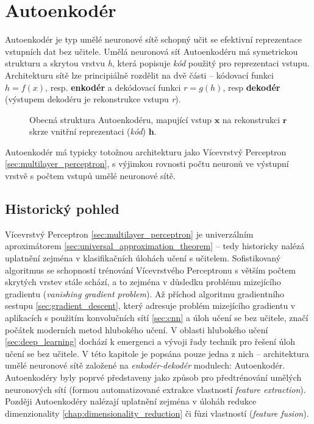 \section{Autoenkodér}
Autoenkodér je typ umělé neuronové sítě schopný učit se efektivní reprezentace vstupních dat bez učitele. Umělá neuronová síť Autoenkodéru má symetrickou strukturu a skrytou vrstvu \emph{h}, která popisuje \emph{kód} použitý pro reprezentaci vstupu.
Architekturu sítě lze principiálně rozdělit na dvě části – kódovací funkci $h = f(x)$, resp. \textbf{enkodér}
a dekódovací funkci $r = g(h)$, resp \textbf{dekodér} (výstupem dekodéru je rekonstrukce vstupu \emph{r}).

\begin{figure}[h]
    \centering
    \caption{Obecná struktura Autoenkodéru, mapující vstup $\mathbf{x}$ na rekonstrukci $\mathbf{r}$ skrze vnitřní reprezentaci (\emph{kód}) $\mathbf{h}$.}
\end{figure}


Autoenkodér má typicky totožnou architekturu jako Vícevrstvý Perceptron \autoref{sec:multilayer_perceptron}, s výjimkou rovnosti počtu neuronů ve výstupní vrstvě s počtem vstupů umělé neuronové sítě.
\subsection{Historický pohled}
Vícevrstvý Perceptron \autoref{sec:multilayer_perceptron} je univerzálním aproximátorem \autoref{sec:universal_approximation_theorem} – tedy historicky nalézá uplatnění zejména v klasifikačních úlohách učení s učitelem.
Sofistikovaný algoritmus se schopností trénování Vícevrstvého Perceptronu s větším počtem skrytých vrstev stále schází, a to zejména v důsledku problému mizejícího gradientu (\emph{vanishing gradient problem}).
Až příchod algoritmu gradientního sestupu \autoref{sec:gradient_descent}, který adresuje problém mizejícího gradientu v aplikacích s použitím konvolučních sítí \autoref{sec:cnn} a úloh učení se bez učitele, značí počátek moderních metod hlubokého učení.
V oblasti hlubokého učení \autoref{sec:deep_learning} dochází k emergenci a vývoji řady technik pro řešení úloh učení se bez učitele.
V této kapitole je popsána pouze jedna z nich – architektura umělé neuronové sítě založené na \emph{enkodér-dekodér} modulech: Autoenkodér. Autoenkodéry byly poprvé představeny jako způsob pro předtrénování umělých neuronových sítí (formou automatizované extrakce vlastností \emph{feature extraction}). 
Později Autoenkodéry nalézají uplatnění zejména v úloháh redukce dimenzionality \autoref{chap:dimensionality_reduction} či fůzi vlastností (\emph{feature fusion}).



